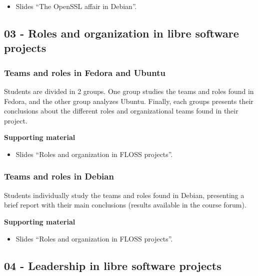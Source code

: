 \documentclass[a4paper]{article}
\begin{document}
\begin{itemize}
\item Slides ``The OpenSSL affair in Debian''.
\end{itemize}

\subsection{03 - Roles and organization in libre software projects}


\subsubsection{Teams and roles in Fedora and Ubuntu}
\label{sub:roles-debian}

Students are divided in 2 groups. One group studies the teams and roles found in Fedora, and the other group analyzes Ubuntu. Finally, each groups
presents their conclusions about the different roles and organizational teams found in their project.

\textbf{Supporting material}

\begin{itemize}
\item Slides ``Roles and organization in FLOSS projects''.
\end{itemize}

\subsubsection{Teams and roles in Debian}
\label{sub:roles-debian}

Students individually study the teams and roles found in Debian, presenting a brief report with their main conclusions (results available in the course forum).

\textbf{Supporting material}

\begin{itemize}
\item Slides ``Roles and organization in FLOSS projects''.
\end{itemize}


\subsection{04 - Leadership in libre software projects}
\end{document}
